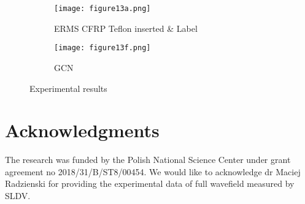 \documentclass[runningheads]{llncs}
\begin{document}
\begin{figure} [!ht]
	\centering
	\begin{subfigure}[b]{0.47\textwidth}
		\centering
		\texttt{[image: figure13a.png]}
		\caption{ERMS CFRP Teflon inserted \& Label}
		\label{fig:Delamination}	
	\end{subfigure}	
	\begin{subfigure}[b]{0.47\textwidth}
		\centering
		\texttt{[image: figure13f.png]}
		\caption{GCN} 
		\label{fig:gcn_exp}
	\end{subfigure}
	\caption{Experimental results}
	\label{fig:Exp_ERMS_teflon}
\end{figure}
\clearpage

\section*{Acknowledgments}
The research was funded by the Polish National Science Center under grant agreement no 2018/31/B/ST8/00454.
We would like to acknowledge dr Maciej Radzienski for providing the experimental data of full wavefield measured by SLDV.



\end{document}
